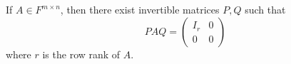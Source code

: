 If $A \in F^{m \times n}$, then there exist invertible matrices $P, Q$ such that
$$
PAQ = \begin{pmatrix} I_r & 0 \\ 0 & 0 \end{pmatrix}
$$
where $r$ is the row rank of $A$.
